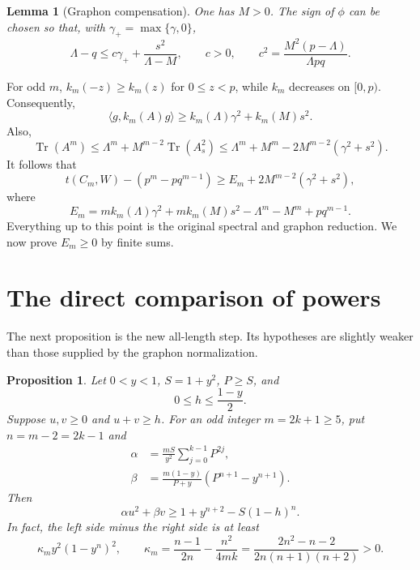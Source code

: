 \documentclass[11pt]{article}
\newtheorem{lemma}[theorem]{Lemma}
\newtheorem{proposition}[theorem]{Proposition}
\theoremstyle{remark}
\newcommand{\Tr}{\operatorname{Tr}}
\newcommand{\ip}[2]{\langle #1,#2\rangle}
\begin{document}
\begin{lemma}[Graphon compensation]\label{lem:compensation}
One has $M>0$. The sign of $\phi$ can be chosen so that, with $\gamma_+=\max\{\gamma,0\}$,
\begin{equation}\label{eq:compensation}
 \Lambda-q\le c\gamma_++\frac{s^2}{\Lambda-M},
 \qquad c>0,\qquad
 c^2=\frac{M^2(p-\Lambda)}{\Lambda pq}.
\end{equation}
\end{lemma}

For odd $m$, $k_m(-z)\ge k_m(z)$ for $0\le z<p$, while $k_m$ decreases on $[0,p)$. Consequently,
\[
 \ip g{k_m(A)g}\ge k_m(\Lambda)\gamma^2+k_m(M)s^2.
\]
Also,
\[
 \Tr(A^m)\le\Lambda^m+M^{m-2}\Tr(A_s^2)
 \le\Lambda^m+M^m-2M^{m-2}(\gamma^2+s^2).
\]
It follows that
\begin{equation}\label{eq:E-reduction}
 t(C_m,W)-(p^m-pq^{m-1})
 \ge E_m+2M^{m-2}(\gamma^2+s^2),
\end{equation}
where
\begin{equation}\label{eq:E}
 E_m=m k_m(\Lambda)\gamma^2+m k_m(M)s^2
       -\Lambda^m-M^m+pq^{m-1}.
\end{equation}
Everything up to this point is the original spectral and graphon reduction. We now prove $E_m\ge0$ by finite sums.

\section{The direct comparison of powers}

The next proposition is the new all-length step. Its hypotheses are slightly weaker than those supplied by the graphon normalization.

\begin{proposition}\label{prop:comparison}
Let $0<y<1$, $S=1+y^2$, $P\ge S$, and
\[
 0\le h\le\frac{1-y}{2}.
\]
Suppose $u,v\ge0$ and $u+v\ge h$. For an odd integer $m=2k+1\ge5$, put $n=m-2=2k-1$ and
\begin{align*}
 \alpha&=\frac{mS}{y^2}\sum_{j=0}^{k-1}P^{2j},\\
 \beta&=\frac{m(1-y)}{P+y}(P^{n+1}-y^{n+1}).
\end{align*}
Then
\begin{equation}\label{eq:comparison}
 \alpha u^2+\beta v
 \ge1+y^{n+2}-S(1-h)^n.
\end{equation}
In fact, the left side minus the right side is at least
\begin{equation}\label{eq:strict-remainder}
 \kappa_m y^2(1-y^n)^2,
 \qquad
 \kappa_m=\frac{n-1}{2n}-\frac{n^2}{4mk}
 =\frac{2n^2-n-2}{2n(n+1)(n+2)}>0.
\end{equation}
\end{proposition}
\end{document}
